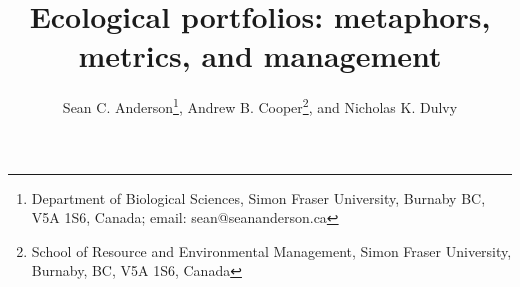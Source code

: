 \documentclass[11pt]{article}
\title{Ecological portfolios: metaphors,\\metrics, and management}
\author{Sean C. Anderson\thanks{Department of Biological Sciences, Simon Fraser
    University, Burnaby BC, V5A 1S6, Canada; email: sean@seananderson.ca},
  Andrew B. Cooper\thanks{School of Resource and Environmental Management,
    Simon Fraser University, Burnaby, BC, V5A 1S6, Canada},
  and Nicholas K. Dulvy\footnotemark[1]}
\date{}
\begin{document}

\maketitle

\linenumbers
\modulolinenumbers[5]
\begin{spacing}{1.3}



%
\clearpage

\clearpage

\clearpage


\end{spacing}
\end{document}
